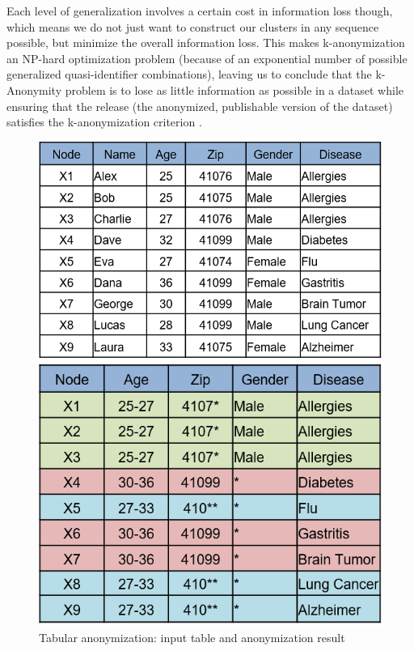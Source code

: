 \documentclass{llncs}
\begin{document}
Each level of generalization involves a certain cost in information loss though, which means we do not just want to construct our clusters in any sequence possible, but minimize the overall information loss. This makes k-anonymization an NP-hard optimization problem (because of an exponential number of possible generalized quasi-identifier combinations), leaving us to conclude that the k-Anonymity problem is to lose as little information as possible in a dataset while ensuring that the release (the anonymized, publishable version of the dataset) satisfies the k-anonymization criterion \cite{aggarwal2005approximation}.

\begin{figure}[!t]
	\centering
	\begin{minipage}[b]{0.5\textwidth}
		\includegraphics[width=\textwidth]{figures/anonym/k_anon_input}
	\end{minipage}
	\hfill
	\begin{minipage}[b]{0.418\textwidth}
		\includegraphics[width=\textwidth]{figures/anonym/k_anon_output}
	\end{minipage}
	\caption{Tabular anonymization: input table and anonymization result}
	\label{fig:anonymized_clusters}
\end{figure}
\end{document}
